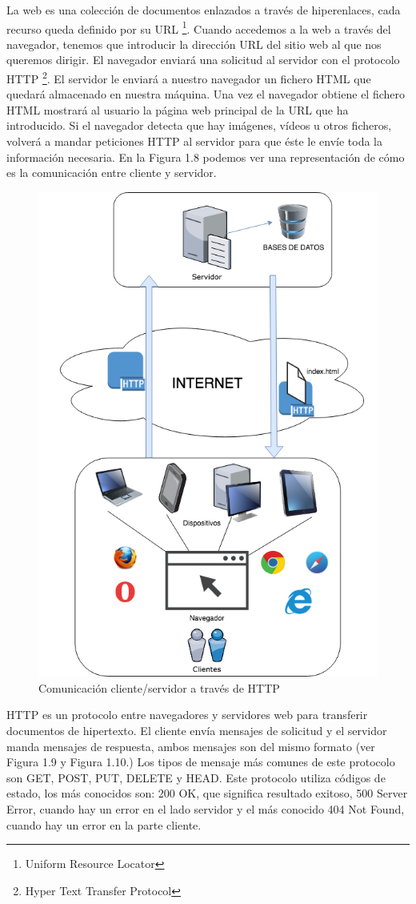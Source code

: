 La web es una colección de documentos enlazados a través de hiperenlaces, cada recurso queda definido por su URL \footnote{Uniform Resource Locator}. Cuando accedemos a la web a través del navegador, tenemos que introducir la dirección URL del sitio web al que nos queremos dirigir. El navegador enviará una solicitud al servidor con el protocolo HTTP \footnote{Hyper Text Transfer Protocol}. El servidor le enviará a nuestro navegador un fichero HTML que quedará almacenado en nuestra máquina. Una vez el navegador obtiene el fichero HTML mostrará al usuario la página web principal de la URL que ha introducido. Si el navegador detecta que hay imágenes, vídeos u otros ficheros, volverá a mandar peticiones HTTP al servidor para que éste le envíe toda la información necesaria. En la Figura 1.8 podemos ver una representación de cómo es la comunicación entre cliente y servidor.
\begin{figure}[H]
    \centering
    \includegraphics[width=0.45\columnwidth]{chapters/images/web.png}
    \caption{Comunicación cliente/servidor a través de HTTP}
    \label{fig:httpprotocol}
\end{figure}
 HTTP es un protocolo entre navegadores y servidores web para transferir documentos de hipertexto. El cliente envía mensajes de solicitud y el servidor manda mensajes de respuesta, ambos mensajes son del mismo formato (ver Figura 1.9 y Figura 1.10.) Los tipos de mensaje más comunes de este protocolo son GET, POST, PUT, DELETE y HEAD. Este protocolo utiliza códigos de estado, los más conocidos son: 200 OK, que significa resultado exitoso, 500 Server Error, cuando hay un error en el lado servidor y el más conocido 404 Not Found, cuando hay un error en la parte cliente. \cite{tecnologiasweb}

